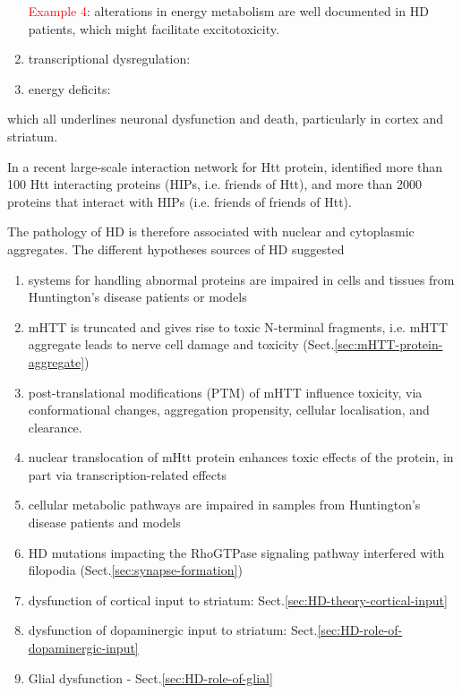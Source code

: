 \begin{enumerate}
  \textcolor{red}{Example 4}:  alterations in energy metabolism are well
  documented in HD patients, which might facilitate excitotoxicity.
  \citep{sanchez2008}
  
  
  \item transcriptional dysregulation: 
  
  \item energy deficits: 
 
\end{enumerate}
which all underlines neuronal dysfunction and death, particularly in cortex and
striatum.




In a recent large-scale interaction network for Htt protein,
\citep{tourette2014} identified more than 100 Htt interacting proteins (HIPs,
i.e. friends of Htt), and more than 2000 proteins that interact with HIPs (i.e.
friends of friends of Htt).


The pathology of HD is therefore associated with nuclear and cytoplasmic
aggregates. The different hypotheses sources of HD suggested
\begin{enumerate}

  \item systems for handling abnormal proteins are impaired in cells and tissues
  from Huntington's disease patients or models
  
  \item mHTT is truncated and gives rise to toxic N-terminal fragments, i.e.
  mHTT aggregate leads to nerve cell damage and toxicity
  (Sect.\ref{sec:mHTT-protein-aggregate})

  \item post-translational modifications (PTM) of mHTT influence toxicity, via
  conformational changes, aggregation propensity, cellular localisation, and
  clearance.

  \item nuclear translocation of mHtt protein enhances toxic effects of the
  protein, in part via transcription-related effects

  \item cellular metabolic pathways are impaired in samples from Huntington's
  disease patients and models  

  \item HD mutations impacting the RhoGTPase signaling pathway interfered with
  filopodia (Sect.\ref{sec:synapse-formation}) \citep{tourette2014}

  \item dysfunction of cortical input to striatum: Sect.\ref{sec:HD-theory-cortical-input}
  
  \item dysfunction of dopaminergic input to striatum:
  Sect.\ref{sec:HD-role-of-dopaminergic-input}
  
  \item Glial dysfunction - Sect.\ref{sec:HD-role-of-glial}
\end{enumerate}

